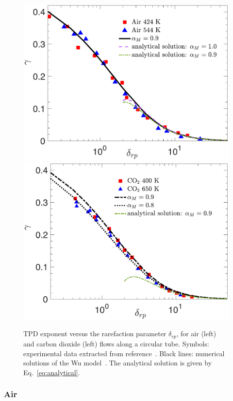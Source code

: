 \begin{figure}\centering
	{\includegraphics[scale=0.34]{SlipJump/IMG/Air_peng_new.pdf}}
	\hskip 0.5cm
	{\includegraphics[scale=0.34]{SlipJump/IMG/CO2_peng_new.pdf}}
	\caption{\label{fig:Air}TPD exponent versus the rarefaction parameter $\delta_{rp}$, for air (left) and carbon dioxide (left) flows along a circular tube. Symbols: experimental data extracted from reference~\cite{arney1962addendum}. Black lines: numerical solutions of the Wu model~\cite{LeiJFM2015}.
		The analytical solution is given by Eq.~\eqref{eq:analytical}. 
	}
	
\end{figure}

\subsubsection{Air}

